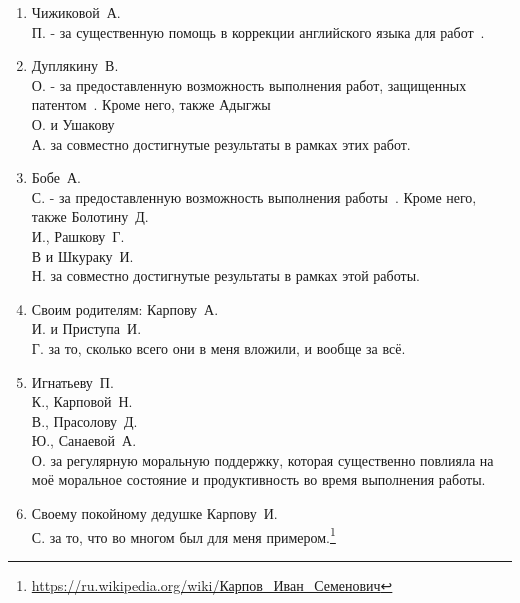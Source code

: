 \begin{enumerate}
\item Чижиковой~А.\\П. - за существенную помощь в коррекции английского языка для работ~\cite{rumtl,rutopics}.
\item Дуплякину~В.\\О. - за предоставленную возможность выполнения работ, защищенных патентом~\cite{Дуплякин_Дмитрий_Ондар_Ушаков_2021}. Кроме него, также Адыгжы~\\О. и Ушакову~\\А. за совместно достигнутые результаты в рамках этих работ. 
\item Бобе~А.\\С. - за предоставленную возможность выполнения работы~\cite{Болотин_Карпов_Рашков_Шкурак_2019}. Кроме него, также Болотину~Д.\\И., Рашкову~Г.\\В и Шкураку~И.\\Н. за совместно достигнутые результаты в рамках этой работы. 
\item Своим родителям: Карпову~А.\\И. и Приступа~И.\\Г. за то, сколько всего они в меня вложили, и вообще за всё.
\item Игнатьеву~П.\\К., Карповой~Н.\\В., Прасолову~Д.\\Ю., Санаевой~А.\\О. за регулярную моральную поддержку, которая существенно повлияла на моё моральное состояние и продуктивность во время выполнения работы. 
\item Своему покойному дедушке Карпову~И.\\С. за то, что во многом был для меня примером.\footnote{\url{https://ru.wikipedia.org/wiki/Карпов\_Иван\_Семенович}}
\end{enumerate}


